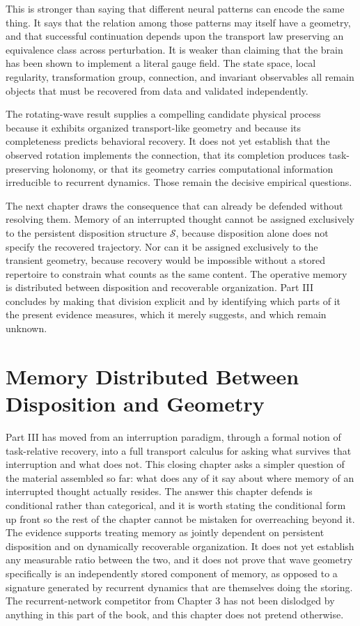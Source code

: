 \documentclass[11pt]{book}
\begin{document}
This is stronger than saying that different neural patterns can encode the same thing. It says that the relation among those patterns may itself have a geometry, and that successful continuation depends upon the transport law preserving an equivalence class across perturbation. It is weaker than claiming that the brain has been shown to implement a literal gauge field. The state space, local regularity, transformation group, connection, and invariant observables all remain objects that must be recovered from data and validated independently.

The rotating-wave result supplies a compelling candidate physical process because it exhibits organized transport-like geometry and because its completeness predicts behavioral recovery. It does not yet establish that the observed rotation implements the connection, that its completion produces task-preserving holonomy, or that its geometry carries computational information irreducible to recurrent dynamics. Those remain the decisive empirical questions.

The next chapter draws the consequence that can already be defended without resolving them. Memory of an interrupted thought cannot be assigned exclusively to the persistent disposition structure $\mathcal S$, because disposition alone does not specify the recovered trajectory. Nor can it be assigned exclusively to the transient geometry, because recovery would be impossible without a stored repertoire to constrain what counts as the same content. The operative memory is distributed between disposition and recoverable organization. Part III concludes by making that division explicit and by identifying which parts of it the present evidence measures, which it merely suggests, and which remain unknown.

\chapter{Memory Distributed Between Disposition and Geometry}

Part III has moved from an interruption paradigm, through a formal notion of task-relative recovery, into a full transport calculus for asking what survives that interruption and what does not. This closing chapter asks a simpler question of the material assembled so far: what does any of it say about where memory of an interrupted thought actually resides. The answer this chapter defends is conditional rather than categorical, and it is worth stating the conditional form up front so the rest of the chapter cannot be mistaken for overreaching beyond it. The evidence supports treating memory as jointly dependent on persistent disposition and on dynamically recoverable organization. It does not yet establish any measurable ratio between the two, and it does not prove that wave geometry specifically is an independently stored component of memory, as opposed to a signature generated by recurrent dynamics that are themselves doing the storing. The recurrent-network competitor from Chapter 3 has not been dislodged by anything in this part of the book, and this chapter does not pretend otherwise.
\end{document}
